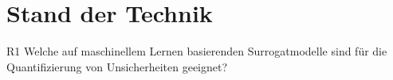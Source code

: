 
\chapter{Stand der Technik}
\label{chapter:stand-der-technik}

\begin{otherlanguage}{american}
%
%
%
\end{otherlanguage}


\begin{otherlanguage}{ngerman}


R1 Welche auf maschinellem Lernen basierenden Surrogatmodelle sind für die Quantifizierung von Unsicherheiten geeignet?


\end{otherlanguage}
